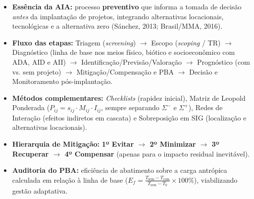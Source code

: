 \begin{boxResumo}
  \begin{itemize}[leftmargin=1.5em, itemsep=2.5pt]
    \item \textbf{Essência da AIA:} processo \textbf{preventivo} que informa a tomada de decisão \emph{antes} da implantação de projetos, integrando alternativas locacionais, tecnológicas e a alternativa zero (Sánchez, 2013; Brasil/MMA, 2016).
    \item \textbf{Fluxo das etapas:} Triagem (\textit{screening}) $\to$ Escopo (\textit{scoping} / TR) $\to$ Diagnóstico (linha de base nos meios físico, biótico e socioeconômico com ADA, AID e AII) $\to$ Identificação/Previsão/Valoração $\to$ Prognóstico (com vs. sem projeto) $\to$ Mitigação/Compensação e PBA $\to$ Decisão e Monitoramento pós-implantação.
    \item \textbf{Métodos complementares:} \textit{Checklists} (rapidez inicial), Matriz de Leopold Ponderada ($P_{ij} = s_{ij} \cdot M_{ij} \cdot I_{ij}$, sempre separando $\Sigma^{-}$ e $\Sigma^{+}$), Redes de Interação (efeitos indiretos em cascata) e Sobreposição em SIG (localização e alternativas locacionais).
    \item \textbf{Hierarquia de Mitigação:} \textbf{1º Evitar $\to$ 2º Minimizar $\to$ 3º Recuperar $\to$ 4º Compensar} (apenas para o impacto residual inevitável).
    \item \textbf{Auditoria do PBA:} eficiência de abatimento sobre a carga antrópica calculada em relação à linha de base ($E_f = \frac{T_{\text{sem}} - T_{\text{com}}}{T_{\text{sem}} - T_0} \times 100\%$), viabilizando gestão adaptativa.
  \end{itemize}
\end{boxResumo}

